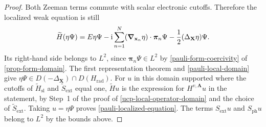 \documentclass[final,reqno]{amsart}
\theoremstyle{remark}
\renewcommand{\i}{\mathrm{i}}
\newcommand{\DC}{D}
\newcommand{\rad}{\mathrm{rad}}
\newcommand{\vpi}{{\bm{\pi}}}
\newcommand{\vx}{\mathbf{x}}
\newcommand{\vA}{{\mathbf{A}}}
\newcommand{\vX}{{\mathbf{X}}}
\begin{document}
\begin{proof}
Both Zeeman terms commute with scalar electronic cutoffs.  Therefore
the localized weak equation is still
\[
 \widetilde H(\eta\Psi)
 =E\eta\Psi-\i\sum_{n=1}^N(\grad_{\vx_n}\eta)\cdot\vpi_n\Psi
                              -\frac12(\Delta_{\vX}\eta)\Psi.
\]
Its right-hand side belongs to $L^2$, since $\vpi_n\Psi\in L^2$ by
\cref{pauli-form-coercivity} of \cref{prop-form-domain}.
The first representation theorem
\cite[Theorem~VI.2.1]{kato1995perturbation} and \cref{pauli-local-domain}
give $\eta\Psi\in\DC(-\Delta_{\vX})\cap\DC(H_\rad)$.  For $u$ in this
domain supported where the cutoffs of $\widetilde H_{\mathrm{sl}}$ and
$\widetilde S_{\mathrm{ext}}$ equal one, $\widetilde H u$ is the
expression for $H^{v,\vA}u$ in the statement, by Step~1 of the proof
of \cref{ucp-local-operator-domain} and the choice of
$\widetilde S_{\mathrm{ext}}$.  Taking $u=\eta\Psi$ proves
\cref{pauli-localized-equation}.  The terms $S_{\mathrm{ext}}u$ and
$S_{\mathrm{ph}}u$ belong to $L^2$ by the bounds above.
\end{proof}
\end{document}

